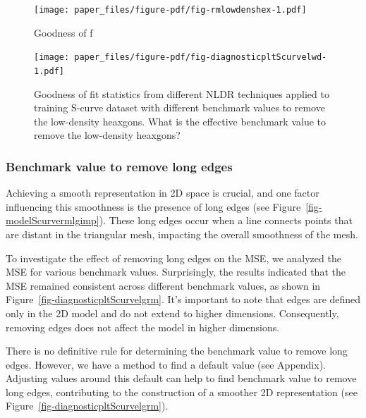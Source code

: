 \documentclass[
  12pt]{article}
\begin{document}
\begin{figure}

{\centering \texttt{[image: paper\_files/figure-pdf/fig-rmlowdenshex-1.pdf]}

}

\caption{\label{fig-rmlowdenshex}Goodness of f}

\end{figure}

\begin{figure}

{\centering \texttt{[image: paper\_files/figure-pdf/fig-diagnosticpltScurvelwd-1.pdf]}

}

\caption{\label{fig-diagnosticpltScurvelwd}Goodness of fit statistics
from different NLDR techniques applied to training S-curve dataset with
different benchmark values to remove the low-density heaxgons. What is
the effective benchmark value to remove the low-density heaxgons?}

\end{figure}

\hypertarget{benchmark-value-to-remove-long-edges}{%
\subsubsection{Benchmark value to remove long
edges}\label{benchmark-value-to-remove-long-edges}}

Achieving a smooth representation in 2D space is crucial, and one factor
influencing this smoothness is the presence of long edges (see
Figure~\ref{fig-modelScurvermlgimp}). These long edges occur when a line
connects points that are distant in the triangular mesh, impacting the
overall smoothness of the mesh.

To investigate the effect of removing long edges on the MSE, we analyzed
the MSE for various benchmark values. Surprisingly, the results
indicated that the MSE remained consistent across different benchmark
values, as shown in Figure~\ref{fig-diagnosticpltScurvelgrm}. It's
important to note that edges are defined only in the 2D model and do not
extend to higher dimensions. Consequently, removing edges does not
affect the model in higher dimensions.

There is no definitive rule for determining the benchmark value to
remove long edges. However, we have a method to find a default value
(see Appendix). Adjusting values around this default can help to find
benchmark value to remove long edges, contributing to the construction
of a smoother 2D representation (see
Figure~\ref{fig-diagnosticpltScurvelgrm}).
\end{document}
